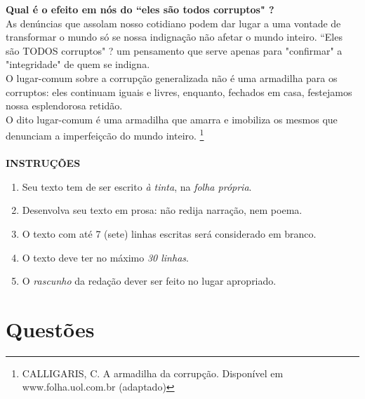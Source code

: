 \documentclass[10pt,a4paper]{article}
\begin{document}
\textbf{Qual \'e o efeito em n\'os do ``eles s\~ao todos corruptos" ?} \\
As den\'uncias que assolam nosso cotidiano podem dar lugar a uma vontade de transformar o mundo s\'o se nossa indigna\c{c}\~ao n\~ao afetar o mundo inteiro. ``Eles s\~ao TODOS corruptos" ? um pensamento que serve apenas para "confirmar" a "integridade" de quem se indigna. \\
O lugar-comum sobre a corrup\c{c}\~ao generalizada n\~ao \'e uma armadilha para os corruptos: eles continuam iguais e livres, enquanto, fechados em casa, festejamos nossa esplendorosa retid\~ao. \\
O dito lugar-comum \'e uma armadilha que amarra e imobiliza os mesmos que denunciam a imperfei\c{c}{c}\~ao do mundo inteiro. \footnote{CALLIGARIS, C. A armadilha da corrup\c{c}\~ao. Dispon\'ivel em www.folha.uol.com.br (adaptado)} \\ \\

\textbf{INSTRU\c{C}\~OES} \\
\begin{enumerate}
\item Seu texto tem de ser escrito \emph{\`a tinta}, na \emph{folha pr\'opria}.
\item Desenvolva seu texto em prosa: n\~ao redija narra\c{c}\~ao, nem poema.
\item O texto com at\'e 7 (sete) linhas escritas ser\'a considerado em branco.
\item O texto deve ter no m\'aximo \emph{30 linhas}.
\item O \emph{rascunho} da reda\c{c}\~ao dever ser feito no lugar apropriado.
\end{enumerate}
\pagebreak

\section*{Quest\~oes}
\end{document}
